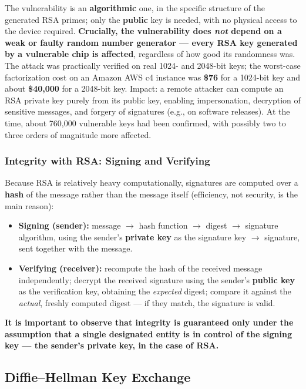 \documentclass[12pt, a4paper]{article}
\begin{document}
The vulnerability is an \textbf{algorithmic} one, in the specific structure of the generated RSA primes; only the \textbf{public} key is needed, with no physical access to the device required. \textcolor{red!70!black}{\textbf{Crucially, the vulnerability does \emph{not} depend on a weak or faulty random number generator --- every RSA key generated by a vulnerable chip is affected}}, regardless of how good its randomness was. The attack was practically verified on real 1024- and 2048-bit keys; the worst-case factorization cost on an Amazon AWS c4 instance was \textbf{\$76} for a 1024-bit key and about \textbf{\$40{,}000} for a 2048-bit key. Impact: a remote attacker can compute an RSA private key purely from its public key, enabling impersonation, decryption of sensitive messages, and forgery of signatures (e.g., on software releases). At the time, about 760{,}000 vulnerable keys had been confirmed, with possibly two to three orders of magnitude more affected.

\subsubsection{Integrity with RSA: Signing and Verifying}
Because RSA is relatively heavy computationally, signatures are computed over a \textbf{hash} of the message rather than the message itself (efficiency, not security, is the main reason):
\begin{itemize}
    \item \textbf{Signing (sender):} message $\to$ hash function $\to$ digest $\to$ signature algorithm, using the sender's \textbf{private key} as the signature key $\to$ signature, sent together with the message.
    \item \textbf{Verifying (receiver):} recompute the hash of the received message independently; decrypt the received signature using the sender's \textbf{public key} as the verification key, obtaining the \emph{expected} digest; compare it against the \emph{actual}, freshly computed digest --- if they match, the signature is valid.
\end{itemize}
\textcolor{blue!50!black}{\textbf{It is important to observe that integrity is guaranteed only under the assumption that a single designated entity is in control of the signing key --- the sender's private key, in the case of RSA.}}

\subsection{Diffie--Hellman Key Exchange}
\label{subsec:dh-04}
\end{document}
